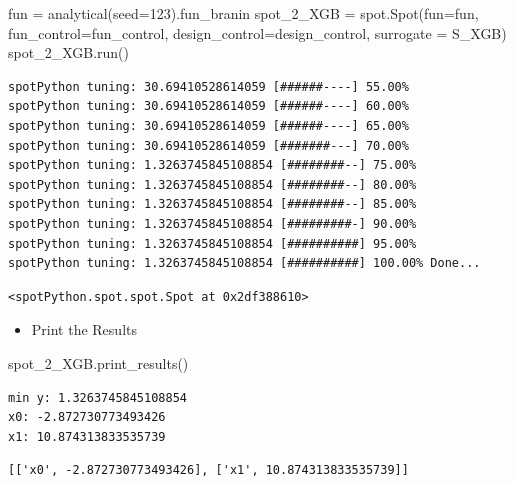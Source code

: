 \documentclass[
  letterpaper,
  DIV=11,
  numbers=noendperiod]{scrreprt}
\newenvironment{Shaded}{\begin{snugshade}}{\end{snugshade}}
\newcommand{\DecValTok}[1]{\textcolor[rgb]{0.68,0.00,0.00}{#1}}
\newcommand{\NormalTok}[1]{\textcolor[rgb]{0.00,0.23,0.31}{#1}}
\newcommand{\OperatorTok}[1]{\textcolor[rgb]{0.37,0.37,0.37}{#1}}
\providecommand{\tightlist}{%
  \setlength{\itemsep}{0pt}\setlength{\parskip}{0pt}}\usepackage{longtable,booktabs,array}
\begin{document}
\begin{Shaded}
\begin{Highlighting}[]
\NormalTok{fun }\OperatorTok{=}\NormalTok{ analytical(seed}\OperatorTok{=}\DecValTok{123}\NormalTok{).fun\_branin}
\NormalTok{spot\_2\_XGB }\OperatorTok{=}\NormalTok{ spot.Spot(fun}\OperatorTok{=}\NormalTok{fun,}
\NormalTok{                     fun\_control}\OperatorTok{=}\NormalTok{fun\_control,}
\NormalTok{                     design\_control}\OperatorTok{=}\NormalTok{design\_control,}
\NormalTok{                     surrogate }\OperatorTok{=}\NormalTok{ S\_XGB)}
\NormalTok{spot\_2\_XGB.run()}
\end{Highlighting}
\end{Shaded}

\begin{verbatim}
spotPython tuning: 30.69410528614059 [######----] 55.00% 
spotPython tuning: 30.69410528614059 [######----] 60.00% 
spotPython tuning: 30.69410528614059 [######----] 65.00% 
spotPython tuning: 30.69410528614059 [#######---] 70.00% 
spotPython tuning: 1.3263745845108854 [########--] 75.00% 
spotPython tuning: 1.3263745845108854 [########--] 80.00% 
spotPython tuning: 1.3263745845108854 [########--] 85.00% 
spotPython tuning: 1.3263745845108854 [#########-] 90.00% 
spotPython tuning: 1.3263745845108854 [##########] 95.00% 
spotPython tuning: 1.3263745845108854 [##########] 100.00% Done...
\end{verbatim}

\begin{verbatim}
<spotPython.spot.spot.Spot at 0x2df388610>
\end{verbatim}

\begin{itemize}
\tightlist
\item
  Print the Results
\end{itemize}

\begin{Shaded}
\begin{Highlighting}[]
\NormalTok{spot\_2\_XGB.print\_results()}
\end{Highlighting}
\end{Shaded}

\begin{verbatim}
min y: 1.3263745845108854
x0: -2.872730773493426
x1: 10.874313833535739
\end{verbatim}

\begin{verbatim}
[['x0', -2.872730773493426], ['x1', 10.874313833535739]]
\end{verbatim}
\end{document}
